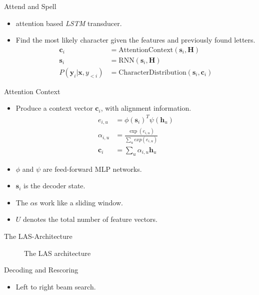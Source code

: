 \documentclass{beamer}
\begin{document}
\begin{frame}{Attend and Spell}
\begin{itemize}
	\item attention based \textit{LSTM} transducer.
	\item Find the most likely character given the features and previously found letters.
		  \begin{align}
			\mathbf{c}_i &= \text{AttentionContext}(\mathbf{s}_i,\mathbf{H}) \\
			\mathbf{s}_i &= \text{RNN}(\mathbf{s}_i,\mathbf{H}) \\
			P(\mathbf{y}_i|\mathbf{x},y_{<i}) &= \text{CharacterDistribution}(\mathbf{s}_i,\mathbf{c}_{i})
		  \end{align}

\end{itemize}
\end{frame}
\begin{frame}{Attention Context}
	\begin{itemize}
		\item Produce a context vector $\mathbf{c}_i$, with alignment information.
			  \begin{align}
			  	e_{i,u} &= \phi(\mathbf{s}_i)^T \psi(\mathbf{h}_u) \\
			  	\alpha_{i,u} &= \frac{\exp(e_{i,u})}{\sum_u exp(e_{i,u})} \\
			  	\mathbf{c}_i &= \sum\limits_{u} \alpha_{i,u}\mathbf{h}_u 
			  \end{align}
		\item $\phi$ and $\psi$ are feed-forward MLP networks.
		\item $\mathbf{s}_i$ is the decoder state.
		\item The $\alpha$s work like a sliding window.
		\item $U$ denotes the total number of feature vectors.
	\end{itemize}
\end{frame}

\begin{frame}{The LAS-Architecture}
\begin{figure}

\caption{The LAS architecture}
\label{fig:las}
\end{figure}
\end{frame}

\begin{frame}{Decoding and Rescoring}
\begin{itemize}
	\item Left to right beam search.
\end{itemize}
\end{frame}
\end{document}

